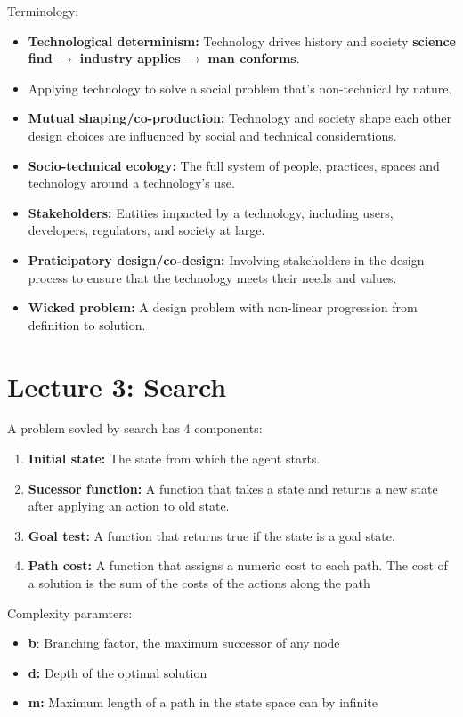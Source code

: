 \documentclass[12pt,a4paper]{article}
\begin{document}
Terminology:
\begin{itemize}
    \item \textbf{Technological determinism:} Technology drives history and society \textbf{science find} $\rightarrow$ \textbf{industry applies} $\rightarrow$ \textbf{man conforms}.
    \item {} Applying technology to solve a social problem that's non-technical by nature.
    \item \textbf{Mutual shaping/co-production:} Technology and society shape each other design choices are influenced by social and technical considerations.
    \item \textbf{Socio-technical ecology:} The full system of people, practices, spaces and technology around a technology's use.
    \item \textbf{Stakeholders:} Entities impacted by a technology, including users, developers, regulators, and society at large.
    \item \textbf{Praticipatory design/co-design:} Involving stakeholders in the design process to ensure that the technology meets their needs and values.
    \item \textbf{Wicked problem:} A design problem with non-linear progression from definition to solution.
\end{itemize}

\section{Lecture 3: Search}
A problem sovled by search has 4 components:
\begin{enumerate}
    \item \textbf{Initial state:} The state from which the agent starts.
    \item \textbf{Sucessor function:} A function that takes a state and returns a new state after applying an action to old state.
    \item \textbf{Goal test:} A function that returns true if the state is a goal state.
    \item \textbf{Path cost:} A function that assigns a numeric cost to each path. The cost of a solution is the sum of the costs of the actions along the path
\end{enumerate}

Complexity paramters:
\begin{itemize}
    \item \textbf{b}: Branching factor, the maximum successor of any node
    \item \textbf{d:} Depth of the optimal solution
    \item \textbf{m:} Maximum length of a path in the state space can by infinite
\end{itemize}
\end{document}
